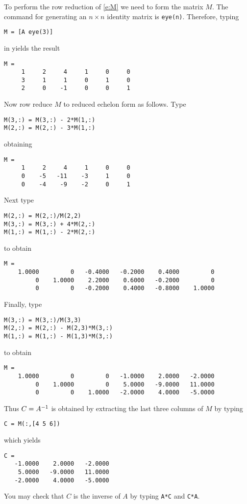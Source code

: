 \documentclass{ximera}
\begin{document}
To perform the row reduction of \eqref{e:M} we need to form the matrix
$M$. The \Matlab command for generating an $n\times n$ identity
matrix is {\tt eye(n)}.  Therefore, typing
\begin{verbatim}
M = [A eye(3)]
\end{verbatim} 
in \Matlab yields the result
\begin{verbatim}
M =
     1     2     4     1     0     0
     3     1     1     0     1     0
     2     0    -1     0     0     1
\end{verbatim}
Now row reduce $M$ to reduced echelon form as follows.  Type
\begin{verbatim}
M(3,:) = M(3,:) - 2*M(1,:)
M(2,:) = M(2,:) - 3*M(1,:)
\end{verbatim}
obtaining
\begin{verbatim}
M =
     1     2     4     1     0     0
     0    -5   -11    -3     1     0
     0    -4    -9    -2     0     1
\end{verbatim}
Next type
\begin{verbatim}
M(2,:) = M(2,:)/M(2,2)
M(3,:) = M(3,:) + 4*M(2,:)
M(1,:) = M(1,:) - 2*M(2,:)
\end{verbatim}
to obtain
{\scriptsize
\begin{verbatim}
M =
    1.0000         0   -0.4000   -0.2000    0.4000         0
         0    1.0000    2.2000    0.6000   -0.2000         0
         0         0   -0.2000    0.4000   -0.8000    1.0000
\end{verbatim}
  \normalsize}
Finally, type
\begin{verbatim}
M(3,:) = M(3,:)/M(3,3)
M(2,:) = M(2,:) - M(2,3)*M(3,:)
M(1,:) = M(1,:) - M(1,3)*M(3,:)
\end{verbatim}
to obtain
{\scriptsize\begin{verbatim}
M =
    1.0000         0         0   -1.0000    2.0000   -2.0000
         0    1.0000         0    5.0000   -9.0000   11.0000
         0         0    1.0000   -2.0000    4.0000   -5.0000
\end{verbatim}
\normalsize}
Thus $C=A^{-1}$ is obtained by extracting the last three columns
of $M$ by typing
\begin{verbatim}
C = M(:,[4 5 6])
\end{verbatim}
which yields
\begin{verbatim}
C =
   -1.0000    2.0000   -2.0000
    5.0000   -9.0000   11.0000
   -2.0000    4.0000   -5.0000
\end{verbatim}
You may check that $C$ is the inverse of $A$ by typing {\tt A*C}
and {\tt C*A}.
\end{document}
